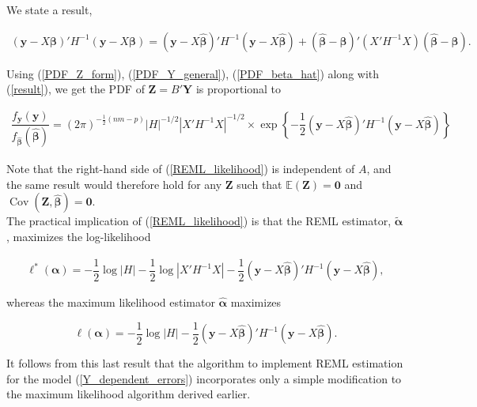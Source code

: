 \documentclass[11pt, a4paper]{article}
\newcommand{\bs}[1]{\boldsymbol{#1}}
\begin{document}
\newpage

We state a result,

\begin{align} \label{result}
\left(
\bs{y} - X\bs{\beta}
\right)'
H^{-1}
\left(
\bs{y} - X\bs{\beta}
\right)
=
\left(
\bs{y} - X\widehat{\bs{\beta}}
\right)'
H^{-1}
\left(
\bs{y} - X\widehat{\bs{\beta}}
\right)
+
\left(
\widehat{\bs{\beta}} - \bs{\beta}
\right)'
\left(
X'H^{-1}X
\right)
\left(
\widehat{\bs{\beta}} - \bs{\beta}
\right).
\end{align}

Using (\ref{PDF_Z_form}), (\ref{PDF_Y_general}), (\ref{PDF_beta_hat}) along with (\ref{result}), we get the PDF of $\bs{Z} = B'\bs{Y}$ is proportional to 

\begin{align}\label{REML_likelihood}
\dfrac{f_{\bs{y}}(\bs{y})}{f_{\widehat{\bs{\beta}}}(\widehat{\bs{\beta}})} =
(2\pi)^{-\frac{1}{2}(nm-p)}
\lvert H \rvert^{-1/2}
\left\lvert
X'H^{-1}X
\right\rvert^{-1/2}
\times
\exp\!\left\{
-\dfrac{1}{2}
\left(
\bs{y} - X\widehat{\bs{\beta}}
\right)'
H^{-1}
\left(
\bs{y} - X\widehat{\bs{\beta}}
\right)
\right\}
\end{align}

Note that the right-hand side of (\ref{REML_likelihood}) is independent of $A$, and the same result would therefore hold for any $\bs{Z}$ such that $\mathbb{E}(\bs{Z}) = \bs{0}$ and $\operatorname{Cov}(\bs{Z}, \widehat{\bs{\beta}}) = \bs{0}$. \\[0.5em]

The practical implication of (\ref{REML_likelihood}) is that the REML estimator, $\widetilde{\bs{\alpha}}$, maximizes the log-likelihood

\begin{align}\label{REML_log_likelihood}
\ell^{*}(\bs{\alpha})
=
-\dfrac{1}{2}
\log \lvert H \rvert
-
\dfrac{1}{2}
\log
\left\lvert
X'H^{-1}X
\right\rvert
-
\dfrac{1}{2}
\left(
\bs{y} - X\widehat{\bs{\beta}}
\right)'
H^{-1}
\left(
\bs{y} - X\widehat{\bs{\beta}}
\right),
\end{align}

whereas the maximum likelihood estimator $\widehat{\bs{\alpha}}$ maximizes

\[
\ell(\bs{\alpha})
=
-\dfrac{1}{2}
\log \lvert H \rvert
-
\dfrac{1}{2}
\left(
\bs{y} - X\widehat{\bs{\beta}}
\right)'
H^{-1}
\left(
\bs{y} - X\widehat{\bs{\beta}}
\right).
\]

It follows from this last result that the algorithm to implement REML
estimation for the model (\ref{Y_dependent_errors}) incorporates only a simple modification to the maximum likelihood algorithm derived earlier. \\[0.5em]
\end{document}
